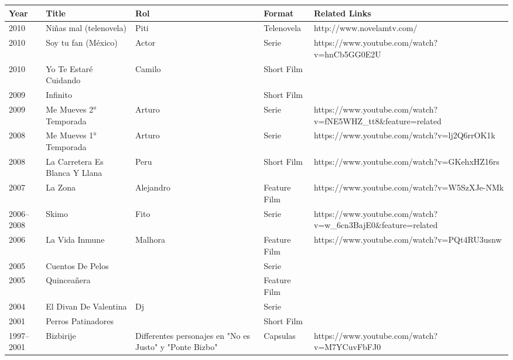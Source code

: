 \documentclass{article}
\begin{document}
\begin{tabular}{lllll}
\toprule
Year & Title & Rol & Format & Related Links \\
\midrule
2010 & Niñas mal (telenovela) & Piti & Telenovela & http://www.novelamtv.com/ \\
2010 & Soy tu fan (México) & Actor & Serie & https://www.youtube.com/watch?v=hnCb5GG0E2U \\
2010 & Yo Te Estaré Cuidando & Camilo & Short Film &  \\
2009 & Infinito &  & Short Film &  \\
2009 & Me Mueves 2° Temporada & Arturo & Serie & https://www.youtube.com/watch?v=fNE5WHZ\_tt8\&feature=related \\
2008 & Me Mueves 1° Temporada & Arturo & Serie & https://www.youtube.com/watch?v=lj2Q6rrOK1k \\
2008 & La Carretera Es Blanca Y Llana & Peru & Short Film & https://www.youtube.com/watch?v=GKehxHZ16rs \\
2007 & La Zona & Alejandro & Feature Film & https://www.youtube.com/watch?v=W5SzXJe-NMk \\
2006–2008 & Skimo & Fito & Serie & https://www.youtube.com/watch?v=w\_6cn3BajE0\&feature=related \\
2006 & La Vida Inmune & Malhora & Feature Film & https://www.youtube.com/watch?v=PQt4RU3usnw \\
2005 & Cuentos De Pelos &  & Serie &  \\
2005 & Quinceañera &  & Feature Film &  \\
2004 & El Divan De Valentina & Dj & Serie &  \\
2001 & Perros Patinadores &  & Short Film &  \\
1997–2001 & Bizbirije & Differentes personajes en "No es Justo" y "Ponte Bizbo" & Capsulas & https://www.youtube.com/watch?v=M7YCuvFbFJ0 \\
\bottomrule
\end{tabular}
\end{document}
